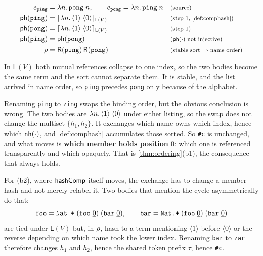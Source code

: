 \documentclass[11pt]{article}
\theoremstyle{definition}
\theoremstyle{plain}
\theoremstyle{remark}
\begin{document}
\[
\begin{array}{r@{\;}l@{\quad}l}
  e_{\texttt{ping}} &= \ulam{n}{\uapp{\uvar{\texttt{pong}}}{\uvar{n}}},
  \qquad
  e_{\texttt{pong}} = \ulam{n}{\uapp{\uvar{\texttt{ping}}}{\uvar{n}}}
    & \just{source} \\[3pt]
  \phash{\texttt{ping}} &= \uhash{\mathsf{L}(V)}{\ulam{n}{\uapp{\langle 1\rangle}{\langle 0\rangle}}}
    & \just{step 1, \cref{def:comphash}} \\[3pt]
  \phash{\texttt{pong}} &= \uhash{\mathsf{L}(V)}{\ulam{n}{\uapp{\langle 1\rangle}{\langle 0\rangle}}}
    & \just{step 1} \\[3pt]
  \phash{\texttt{ping}} &= \phash{\texttt{pong}}
    & \just{$\phash{\cdot}$ not injective} \\[3pt]
  \HEnv &= \mathsf{R}(\texttt{ping})\,\mathsf{R}(\texttt{pong})
    & \just{stable sort $\Rightarrow$ name order}
\end{array}
\]

In $\mathsf{L}(V)$ both mutual references collapse to one index, so the two bodies become the same
term and the sort cannot separate them. It is stable, and the list arrived in name order, so
\texttt{ping} precedes \texttt{pong} only because of the alphabet.

Renaming \texttt{ping} to \texttt{zing} swaps the binding order, but the obvious conclusion is wrong.
The two bodies are $\lambda n.\,\langle 1\rangle\;\langle 0\rangle$ under either listing, so the
swap does not change the multiset $\{h_1,h_2\}$. It exchanges which name owns which index, hence
which $\mathsf{nh}(\cdot)$, and \cref{def:comphash} accumulates those sorted. So \texttt{\#c} is unchanged,
and what moves is \textbf{which member holds position $0$}: which one is referenced transparently and
which opaquely. That is \cref{thm:ordering}(b1), the consequence that always holds.

For (b2), where $\mathsf{hashComp}$ itself moves, the exchange has to change a member hash and not merely
relabel it. Two bodies that mention the cycle asymmetrically do that:
\[
  \texttt{foo} = \texttt{Nat.+}\;(\texttt{foo}\;\underline{0})\;(\texttt{bar}\;\underline{0}),
  \qquad
  \texttt{bar} = \texttt{Nat.+}\;(\texttt{foo}\;\underline{0})\;(\texttt{bar}\;\underline{0})
\]
are tied under $\mathsf{L}(V)$ but, in $\rho$, hash to a term mentioning $\langle 1 \rangle$ before
$\langle 0 \rangle$ or the reverse depending on which name took the lower index. Renaming
\texttt{bar} to \texttt{zar} therefore changes $h_1$ and $h_2$, hence the shared token prefix
$\overline{\tau}$, hence \texttt{\#c}.
\end{document}
